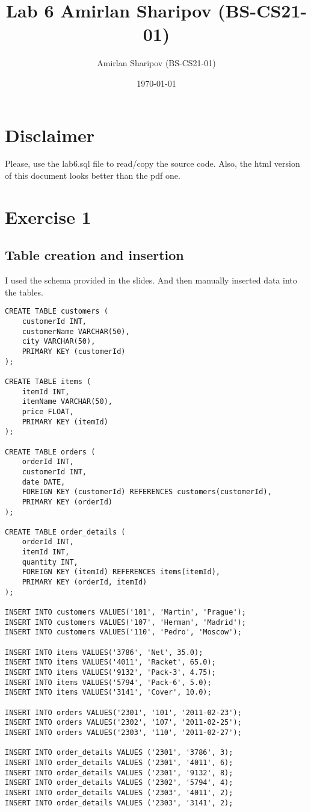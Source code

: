 \documentclass[11pt]{article}
\author{Amirlan Sharipov (BS-CS21-01)}
\date{\today}
\title{Lab 6 Amirlan Sharipov (BS-CS21-01)}
\begin{document}
\maketitle
\tableofcontents


\section{Disclaimer}
\label{sec:orgd9c7526}
Please, use the lab6.sql file to read/copy the source code. Also, the html version of this document looks better than the pdf one.

\section{Exercise 1}
\label{sec:orgbb19d8e}
\subsection{Table creation and insertion}
\label{sec:orge2ed6dc}
I used the schema provided in the slides. And then manually inserted data into the tables.

\begin{verbatim}
CREATE TABLE customers (
    customerId INT,
    customerName VARCHAR(50),
    city VARCHAR(50),
    PRIMARY KEY (customerId)
);

CREATE TABLE items (
    itemId INT,
    itemName VARCHAR(50),
    price FLOAT,
    PRIMARY KEY (itemId)
);

CREATE TABLE orders (
    orderId INT,
    customerId INT,
    date DATE,
    FOREIGN KEY (customerId) REFERENCES customers(customerId),
    PRIMARY KEY (orderId)
);

CREATE TABLE order_details (
    orderId INT,
    itemId INT,
    quantity INT,
    FOREIGN KEY (itemId) REFERENCES items(itemId),
    PRIMARY KEY (orderId, itemId)
);

INSERT INTO customers VALUES('101', 'Martin', 'Prague');
INSERT INTO customers VALUES('107', 'Herman', 'Madrid');
INSERT INTO customers VALUES('110', 'Pedro', 'Moscow');

INSERT INTO items VALUES('3786', 'Net', 35.0);
INSERT INTO items VALUES('4011', 'Racket', 65.0);
INSERT INTO items VALUES('9132', 'Pack-3', 4.75);
INSERT INTO items VALUES('5794', 'Pack-6', 5.0);
INSERT INTO items VALUES('3141', 'Cover', 10.0);

INSERT INTO orders VALUES('2301', '101', '2011-02-23');
INSERT INTO orders VALUES('2302', '107', '2011-02-25');
INSERT INTO orders VALUES('2303', '110', '2011-02-27');

INSERT INTO order_details VALUES ('2301', '3786', 3);
INSERT INTO order_details VALUES ('2301', '4011', 6);
INSERT INTO order_details VALUES ('2301', '9132', 8);
INSERT INTO order_details VALUES ('2302', '5794', 4);
INSERT INTO order_details VALUES ('2303', '4011', 2);
INSERT INTO order_details VALUES ('2303', '3141', 2);
\end{verbatim}
\end{document}
